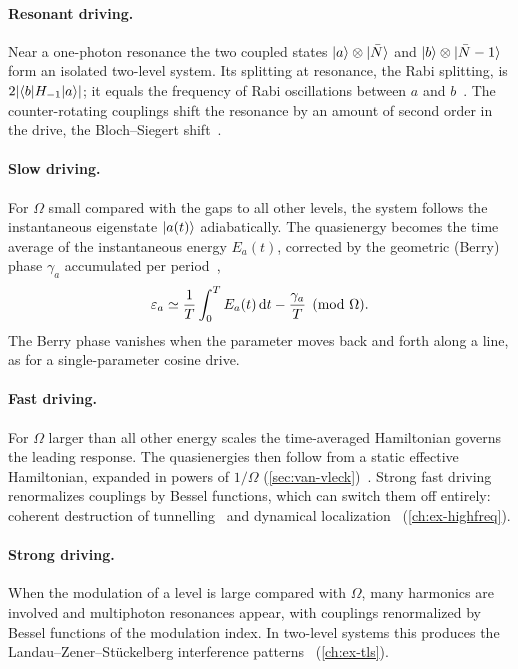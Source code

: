 \paragraph{Resonant driving.}
Near a one-photon resonance the two coupled states $\lvert a\rangle\otimes\lvert \bar N\rangle$ and $\lvert b\rangle\otimes\lvert \bar N-1\rangle$ form an isolated two-level system. Its splitting at resonance, the
Rabi splitting, is $2\lvert \langle b\vert H_{-1}\vert a\rangle\rvert$; it equals the frequency of Rabi
oscillations between $a$ and $b$~\cite{rabi1937space}. The counter-rotating
couplings shift the resonance by an amount of second order in the drive, the
Bloch--Siegert shift~\cite{bloch1940magnetic,shirley1965solution}.

\paragraph{Slow driving.}
For $\Omega$ small compared with the gaps to all other levels, the system follows the
instantaneous eigenstate $\lvert a(t)\rangle$ adiabatically. The quasienergy becomes the time
average of the instantaneous energy $E_a(t)$, corrected by the geometric (Berry) phase
$\gamma_a$ accumulated per period~\cite{breuer1989adiabatic,drese1999floquet},
\begin{equation}\label{eq:adiabatic}
  \varepsilon_a\simeq\frac1T\int_0^T E_a(t)\,\mathrm{d} t-\frac{\gamma_a}{T}\pmod\Omega .
\end{equation}
The Berry phase vanishes when the parameter moves back and forth along a line, as for a
single-parameter cosine drive.

\paragraph{Fast driving.}
For $\Omega$ larger than all other energy scales the time-averaged Hamiltonian governs
the leading response. The quasienergies then follow from a static effective
Hamiltonian, expanded in powers of $1/\Omega$
(\cref{sec:van-vleck})~\cite{magnus1954exponential,maricq1982application,rahav2003effective,eckardt2015high,bukov2015universal,mikami2016brillouin}.
Strong fast driving renormalizes couplings by Bessel functions, which can switch them off
entirely: coherent destruction of tunnelling~\cite{grossmann1991coherent} and dynamical
localization~\cite{dunlap1986dynamic} (\cref{ch:ex-highfreq}).

\paragraph{Strong driving.}
When the modulation of a level is large compared with $\Omega$, many harmonics are
involved and multiphoton resonances appear, with couplings renormalized by Bessel functions
of the modulation index. In two-level systems this produces the
Landau--Zener--St\"uckelberg interference
patterns~\cite{shevchenko2010landau,oliver2005mach,sillanpaa2006continuous,ivakhnenko2023nonadiabatic}
(\cref{ch:ex-tls}).

